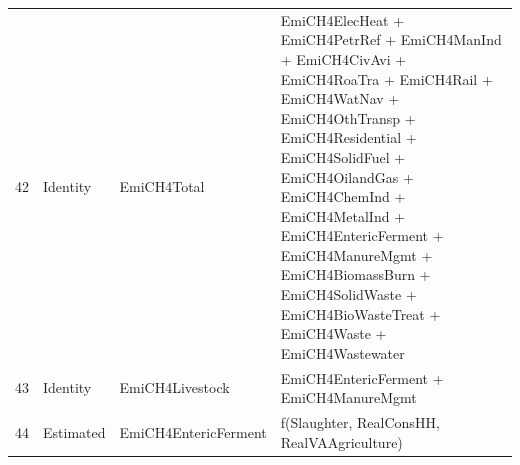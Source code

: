 \begin{table}
\begin{tabular}[t]{rll>{\raggedright\arraybackslash}p{10cm}}
42 & Identity & EmiCH4Total & EmiCH4ElecHeat + EmiCH4PetrRef + EmiCH4ManInd + EmiCH4CivAvi + EmiCH4RoaTra + EmiCH4Rail + EmiCH4WatNav + EmiCH4OthTransp + EmiCH4Residential + EmiCH4SolidFuel + EmiCH4OilandGas + EmiCH4ChemInd + EmiCH4MetalInd + EmiCH4EntericFerment + EmiCH4ManureMgmt + EmiCH4BiomassBurn + EmiCH4SolidWaste + EmiCH4BioWasteTreat + EmiCH4Waste + EmiCH4Wastewater\\
43 & Identity & EmiCH4Livestock & EmiCH4EntericFerment + EmiCH4ManureMgmt\\
44 & Estimated & EmiCH4EntericFerment & f(Slaughter, RealConsHH, RealVAAgriculture)\\
\bottomrule
\end{tabular}
\end{table}
